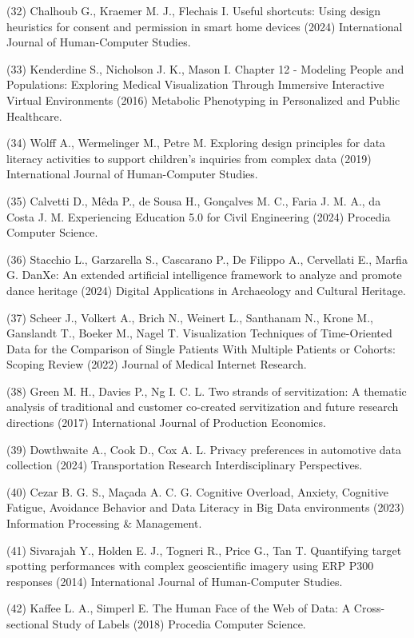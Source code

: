 \documentclass[
	12pt,				%
	oneside,			%
	a4paper,			%
	english,			%
	brazil				%
	]{abntex2ppgsi}
\begin{document}
\begin{apendicesenv}
(32) Chalhoub G., Kraemer M. J., Flechais I. Useful shortcuts: Using design heuristics for consent and permission in smart home devices (2024) International Journal of Human-Computer Studies.

(33) Kenderdine S., Nicholson J. K., Mason I. Chapter 12 - Modeling People and Populations: Exploring Medical Visualization Through Immersive Interactive Virtual Environments (2016) Metabolic Phenotyping in Personalized and Public Healthcare.

(34) Wolff A., Wermelinger M., Petre M. Exploring design principles for data literacy activities to support children’s inquiries from complex data (2019) International Journal of Human-Computer Studies.

(35) Calvetti D., Mêda P., de Sousa H., Gonçalves M. C., Faria J. M. A., da Costa J. M. Experiencing Education 5.0 for Civil Engineering (2024) Procedia Computer Science.

(36) Stacchio L., Garzarella S., Cascarano P., De Filippo A., Cervellati E., Marfia G. DanXe: An extended artificial intelligence framework to analyze and promote dance heritage (2024) Digital Applications in Archaeology and Cultural Heritage.

(37) Scheer J., Volkert A., Brich N., Weinert L., Santhanam N., Krone M., Ganslandt T., Boeker M., Nagel T. Visualization Techniques of Time-Oriented Data for the Comparison of Single Patients With Multiple Patients or Cohorts: Scoping Review (2022) Journal of Medical Internet Research.

(38) Green M. H., Davies P., Ng I. C. L. Two strands of servitization: A thematic analysis of traditional and customer co-created servitization and future research directions (2017) International Journal of Production Economics.

(39) Dowthwaite A., Cook D., Cox A. L. Privacy preferences in automotive data collection (2024) Transportation Research Interdisciplinary Perspectives.

(40) Cezar B. G. S., Maçada A. C. G. Cognitive Overload, Anxiety, Cognitive Fatigue, Avoidance Behavior and Data Literacy in Big Data environments (2023) Information Processing \& Management.

(41) Sivarajah Y., Holden E. J., Togneri R., Price G., Tan T. Quantifying target spotting performances with complex geoscientific imagery using ERP P300 responses (2014) International Journal of Human-Computer Studies.

(42) Kaffee L. A., Simperl E. The Human Face of the Web of Data: A Cross-sectional Study of Labels (2018) Procedia Computer Science.


\end{apendicesenv}
\end{document}
